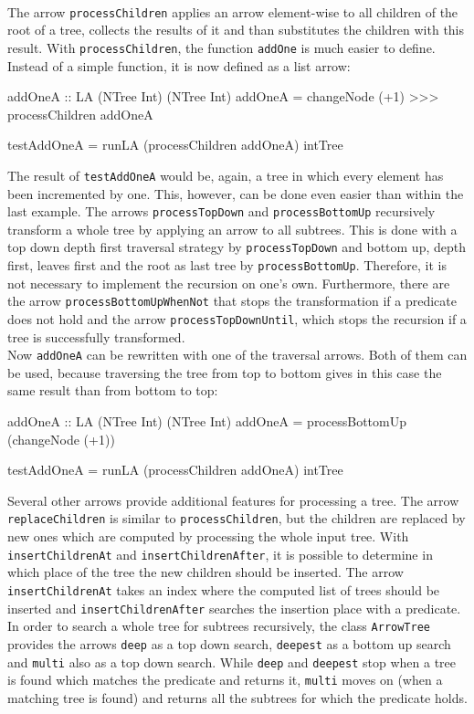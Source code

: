 \documentclass[11pt,a4paper,headsepline, bibtotoc]{scrreprt}
\begin{document}
\\
The arrow \texttt{processChildren} applies an arrow element-wise to all children of the root of a tree, collects the results of it and than substitutes the children with this result. With \texttt{processChildren}, the function \texttt{addOne} is much easier to define. Instead of a simple function, it is now defined as a list arrow:
\begin{code}[caption=processChildren Example]
addOneA :: LA (NTree Int) (NTree Int)
addOneA = changeNode (+1) >>> processChildren addOneA

testAddOneA = runLA (processChildren addOneA) intTree
\end{code}
The result of \texttt{testAddOneA} would be, again, a tree in which every element has been incremented by one. This, however, can be done even easier than within the last example. The arrows \texttt{processTopDown} and \texttt{processBottomUp} recursively transform a whole tree by applying an arrow to all subtrees. This is done with a top down depth first traversal strategy by \texttt{processTopDown} and bottom up, depth first, leaves first and the root as last tree by \texttt{processBottomUp}. Therefore, it is not necessary to implement the recursion on one's own. Furthermore, there are the arrow \texttt{processBottomUpWhenNot} that stops the transformation if a predicate does not hold and the arrow \texttt{processTopDownUntil}, which stops the recursion if a tree is successfully transformed.\\
Now \texttt{addOneA} can be rewritten with one of the traversal arrows. Both of them can be used, because traversing the tree from top to bottom gives in this case the same result than from bottom to top:
\begin{code}[caption=processBottomUp Example]
addOneA :: LA (NTree Int) (NTree Int)
addOneA = processBottomUp (changeNode (+1))

testAddOneA = runLA (processChildren addOneA) intTree
\end{code}
Several other arrows provide additional features for processing a tree. The arrow \texttt{replace\-Children} is similar to \texttt{processChildren}, but the children are replaced by new ones which are computed by processing the whole input tree. With \texttt{insertChildrenAt} and \texttt{insertChildren\-After}, it is possible to determine in which place of the tree the new children should be inserted. The arrow \texttt{insertChildrenAt} takes an index where the computed list of trees should be inserted and \texttt{insertChildrenAfter} searches the insertion place with a predicate.\\
In order to search a whole tree for subtrees recursively, the class \texttt{ArrowTree} provides the arrows \texttt{deep} as a top down search, \texttt{deepest} as a bottom up search and \texttt{multi} also as a top down search. While \texttt{deep} and \texttt{deepest} stop when a tree is found which matches the predicate and returns it, \texttt{multi} moves on (when a matching tree is found) and returns all the subtrees for which the predicate holds.
\end{document}
